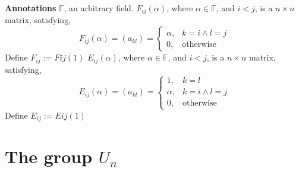 \documentclass[12pt]{article}
\begin{document}
\textbf{Annotations}\newline
\textbf{$\mathbb{F}$}, an arbitrary field. \newline
\textbf{$F_{ij}(\alpha)$}, where $\alpha \in \mathbb{F}$, and $i<j$, is a $n \times n$ matrix, satisfying, 
$$
F_{ij}(\alpha)=(a_{kl})=\begin{cases}
			\alpha, & k=i \land l=j\\
            0, & \text{otherwise}
		 \end{cases}
$$
Define $F_{ij}:=F{ij}(1)$ \newline
\textbf{$E_{ij}(\alpha)$}, where $\alpha \in \mathbb{F}$, and $i<j$, is a $n \times n$ matrix, satisfying, 
$$
E_{ij}(\alpha)=(a_{kl})=\begin{cases}
            1, & k=l\\
			\alpha, & k=i \land l=j\\
            0, & \text{otherwise}
		 \end{cases}
$$
Define $E_{ij}:=E{ij}(1)$ \newline

\section{The group $U_n$}
\end{document}
